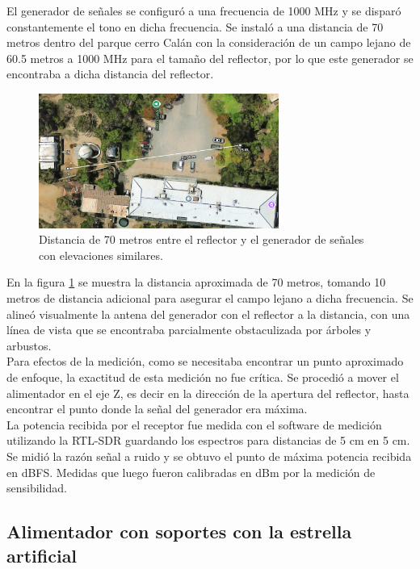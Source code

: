 El generador de señales se configuró a una frecuencia de 1000 MHz y se disparó constantemente el tono en dicha frecuencia. Se instaló a una distancia de 70 metros dentro del parque cerro Calán con la consideración de un campo lejano de 60.5 metros a 1000 MHz para el tamaño del reflector, por lo que este generador se encontraba a dicha distancia del reflector.\\

\begin{figure}
    \centering
    \includegraphics[width=0.7\textwidth]{img/70m_measure}
    \caption{Distancia de 70 metros entre el reflector y el generador de señales con elevaciones similares.}
    \label{fig:70m_measure}
\end{figure} 

En la figura \ref{fig:70m_measure} se muestra la distancia aproximada de 70 metros, tomando 10 metros de distancia adicional para asegurar el campo lejano a dicha frecuencia. Se alineó visualmente la antena del generador con el reflector a la distancia, con una línea de vista que se encontraba parcialmente  obstaculizada por árboles y arbustos.\\

Para efectos de la medición, como se necesitaba encontrar un punto aproximado de enfoque, la exactitud de esta medición no fue crítica. Se procedió a mover el alimentador en el eje Z, es decir en la dirección de la apertura del reflector, hasta encontrar el punto donde la señal del generador era máxima.\\

La potencia recibida por el receptor fue medida con el software de medición utilizando la RTL-SDR guardando los espectros para distancias de 5 cm en 5 cm. Se midió la razón señal a ruido y se obtuvo el punto de máxima potencia recibida en dBFS. Medidas que luego fueron calibradas en dBm por la medición de sensibilidad.\\

\subsection{Alimentador con soportes con la estrella artificial}

